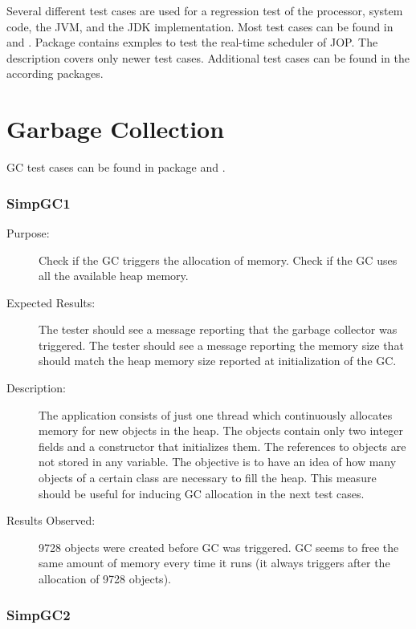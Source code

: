 
Several different test cases are used for a regression test of the
processor, system code, the JVM, and the JDK implementation. Most
test cases can be found in  and
. Package  contains exmples
to test the real-time scheduler of JOP. The description covers only
newer test cases. Additional test cases can be found in the
according packages.

\section{Garbage Collection}

GC test cases can be found in package  and
.

\subsubsection{SimpGC1}

\begin{description}
    \item[Purpose:]
Check if the GC triggers the allocation of memory.
Check if the GC uses all the available heap memory.
    \item[Expected Results:]
The tester should see a message reporting that
the garbage collector was triggered. The tester should see a message reporting
the memory size that should match the heap memory size reported at initialization of the
GC.
    \item[Description:]
The application consists of just one thread which continuously
allocates memory for new objects in the heap. The objects contain
only two integer fields and a constructor that initializes them. The
references to objects are not stored in any variable. The objective
is to have an idea of how many objects of a certain class are
necessary to fill the heap. This measure should be useful for
inducing GC allocation in the next test cases.
    \item[Results Observed:]
9728 objects were created before GC was triggered. GC seems to free
the same amount of memory every time it runs (it always triggers
after the allocation of 9728 objects).
\end{description}

\subsubsection{SimpGC2}

